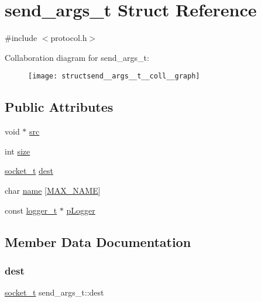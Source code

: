\hypertarget{structsend__args__t}{}\section{send\+\_\+args\+\_\+t Struct Reference}
\label{structsend__args__t}


{\ttfamily \#include $<$protocol.\+h$>$}



Collaboration diagram for send\+\_\+args\+\_\+t\+:
\nopagebreak
\begin{figure}[H]
\begin{center}
\leavevmode
\texttt{[image: structsend\_\_args\_\_t\_\_coll\_\_graph]}
\end{center}
\end{figure}
\subsection*{Public Attributes}
\begin{DoxyCompactItemize}
\item 
void $\ast$ \hyperlink{structsend__args__t_a1157e08ddef1b804c8609b013a14b02a}{src}
\item 
int \hyperlink{structsend__args__t_a6b05eee147bc0506bc00ab759732adba}{size}
\item 
\hyperlink{datatypes_8h_a30353f381f5fccbb956eea1f3a110b6c}{socket\+\_\+t} \hyperlink{structsend__args__t_aadc0f2cd20c6545c631d3529132c0060}{dest}
\item 
char \hyperlink{structsend__args__t_ad858929a0359a7cb06cd971619ef0baa}{name} \mbox{[}\hyperlink{datatypes_8h_ac7c0207aa5a0e10d378be03b68041350}{M\+A\+X\+\_\+\+N\+A\+ME}\mbox{]}
\item 
const \hyperlink{structlogger__t}{logger\+\_\+t} $\ast$ \hyperlink{structsend__args__t_a70fc025c17db3230f4f607415a9408e5}{p\+Logger}
\end{DoxyCompactItemize}


\subsection{Member Data Documentation}
\mbox{\label{structsend__args__t_aadc0f2cd20c6545c631d3529132c0060}} 
\subsubsection{\texorpdfstring{dest}{dest}}
{\footnotesize\ttfamily \hyperlink{datatypes_8h_a30353f381f5fccbb956eea1f3a110b6c}{socket\+\_\+t} send\+\_\+args\+\_\+t\+::dest}

